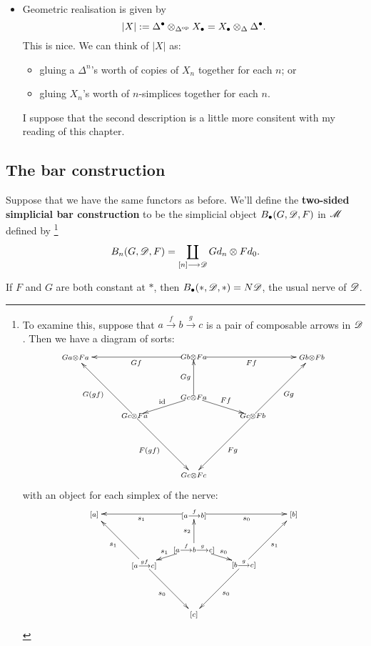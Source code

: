 \documentclass[11pt]{article}
\begin{document}
\begin{5. The unreasonably effective (co)bar construction}
\begin{itemise}
\begin{itemize}
\item Geometric realisation is given by
\[|X|:=\Delta^\bullet \otimes_{\Delta^{\textup{op}}}X_\bullet = X_\bullet\otimes_{\Delta} \Delta^\bullet.\]
This is nice. We can think of $|X|$ as:
\begin{itemize}\squishlist
\setlength{\parindent}{.25in}
\item gluing a $\Delta^n$'s worth of copies of $X_n$ together for each $n$; or
\item gluing $X_n$'s worth of $n$-simplices together for each $n$.
\end{itemize}
I suppose that the second description is a little more consitent with my reading of this chapter.
\end{itemize}
\end{itemise}
\subsection*{The bar construction}
Suppose that we have the same functors as before. We'll define the \textbf{two-sided simplicial bar construction} to be the simplicial object $B_\bullet (G,\mathscr{D},F)$ in $\mathscr{M}$ defined by
\footnote{To examine this, suppose that $a\overset{f}{\to}b\overset{g}{\to}c$ is a pair of composable arrows in $\mathscr{D}$. Then we have a diagram of sorts:
\[{\def\objectstyle{\scriptstyle}
\xymatrix@!0@=3cm@!C{
Ga\otimes Fa
\ar@{}[rr]|{Gb\otimes Fa}="2"
\ar@{}[rd]|{Gc\otimes Fa}="8"
&&%
Gb\otimes Fb
\ar@{}[ld]|{Gc\otimes Fb}="6"
\\&%
\ar@{}"2"|(.657){Gc\otimes Fa}="3"
Gc\otimes Fc
\ar"2";[lu]^-{Gf}
\ar"2";[ru]_-{Ff}
\ar"6";[ru]_-{Gg}
\ar"6";[]^-{Fg}
\ar"3";"2"^-{Gg}
\ar"3";"6"^-{Ff}
\ar"3";"8"_-{\id}
\ar"8";[]_-{F(gf)}
\ar"8";[lu]^-{G(gf)}
%
}}\]
with an object for each simplex of the nerve:
\[{\def\objectstyle{\scriptstyle}
\xymatrix@!0@=3cm@!C{
[a]
\ar@{}[rr]|{[a\overset{f}{\to}b]}="2"
\ar@{}[rd]|{[a\overset{gf}{\to}c]}="8"
&&%
[b]
\ar@{}[ld]|{[b\overset{g}{\to}c]}="6"
\\&%
\ar@{}"2"|(.657){[a\overset{f}{\to}b\overset{g}{\to}c]}="3"
[c]
\ar"2";[lu]^-{s_1}
\ar"2";[ru]_-{s_0}
\ar"6";[ru]_-{s_1}
\ar"6";[]^-{s_0}
\ar"3";"2"^-{s_2}
\ar"3";"6"^-{s_0}
\ar"3";"8"_-{s_1}
\ar"8";[]_-{s_0}
\ar"8";[lu]^-{s_1}
%
}}\]}
\[B_n(G,\mathscr{D},F)=\coprod_{[n]\longrightarrow\mathscr{D}}Gd_n\otimes Fd_0.\]
\begin{itemise}
\setlength{\parindent}{.25in}
\item If $F$ and $G$ are both constant at $*$, then $B_{\bullet }(*,\mathscr{D},*)=N\mathscr{D}$, the usual nerve of $\mathscr{D}$.

\end{itemise}
\end{5. The unreasonably effective (co)bar construction}
\end{document}
